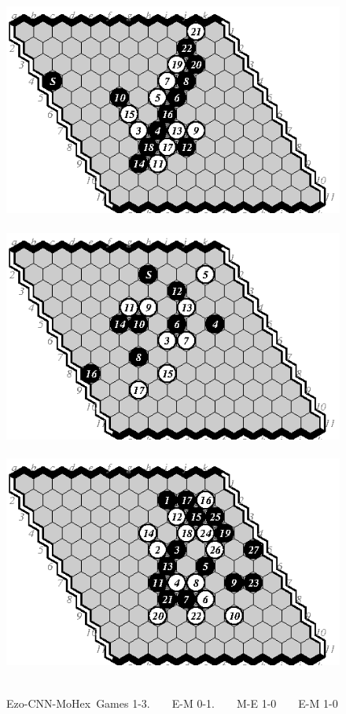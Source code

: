 \documentclass{icga}
\def\Ec{\mbox{\sc Ezo-CNN}}
\def\Mx{\mbox{\sc MoHex}}
\begin{document}
\begin{figure}[hbp]
\includegraphics[scale=1]{pix/11.em1.eps}\hspace*{-1.2cm}\
\includegraphics[scale=1]{pix/11.me2.eps}\hspace*{-1.2cm}\
\includegraphics[scale=1]{pix/11.em3.eps}\hspace*{-1.2cm}\
\caption{\Ec-\Mx\ Games 1-3. ~ ~ E-M 0-1. ~ ~ M-E 1-0 ~ ~ E-M 1-0}
\label{fig:EM1-3}
\end{figure}
\end{document}

